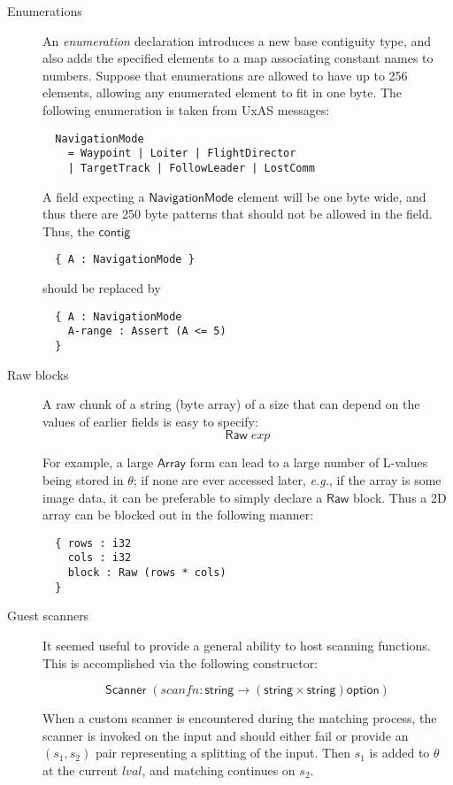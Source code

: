 \documentclass[a4paper,UKenglish,cleveref, autoref, thm-restate]{lipics-v2021}
\newcommand{\eg}{\textit{e.g.}}
\newcommand{\konst}[1]{\ensuremath{\mathsf{#1}}}
\newcommand{\lval}{\ensuremath{\mathit{lval}}}
\begin{document}
\begin{description}

\item [Enumerations] An \emph{enumeration} declaration
introduces a new base contiguity type, and also adds the specified
elements to a map associating constant names to numbers.
Suppose that enumerations are allowed to have up to 256 elements,
allowing any enumerated element to fit in one byte. The following
enumeration is taken from UxAS messages:
{\small
\begin{verbatim}
  NavigationMode
    = Waypoint | Loiter | FlightDirector
    | TargetTrack | FollowLeader | LostComm
\end{verbatim}
}
A field expecting a \konst{NavigationMode} element will be one byte wide,
and thus there are 250 byte patterns that should not be allowed in the
field. Thus, the \konst{contig}

{\small\begin{verbatim}
  { A : NavigationMode }
\end{verbatim}
}
should be replaced by

{\small
\begin{verbatim}
  { A : NavigationMode
    A-range : Assert (A <= 5)
  }
\end{verbatim}
}

\item [Raw blocks] A raw chunk of a string (byte array) of a size that
  can depend on the values of earlier fields is easy to specify:
  \[ \konst{Raw}\; \mathit{exp} \]

For example, a large \konst{Array} form can lead to a large number of
L-values being stored in $\theta$; if none are ever accessed later,
\eg, if the array is some image data, it can be preferable to simply
declare a \konst{Raw} block. Thus a 2D array can be blocked out in the
following manner:

{\small
\begin{verbatim}
  { rows : i32
    cols : i32
    block : Raw (rows * cols)
  }
\end{verbatim}
}

\item [Guest scanners] It seemed useful to provide a general ability
  to host scanning functions. This is accomplished via the following
  constructor:

  \[ \konst{Scanner}\;
     (\mathit{scanfn} : \konst{string} \to (\konst{string} \times \konst{string})\konst{option}) \]

  When a custom scanner is encountered during the matching process,
  the scanner is invoked on the input and should either fail or
  provide an $(s_1,s_2)$ pair representing a splitting of the
  input. Then $s_1$ is added to $\theta$ at the current \lval, and
  matching continues on $s_2$.


\end{description}
\end{document}
